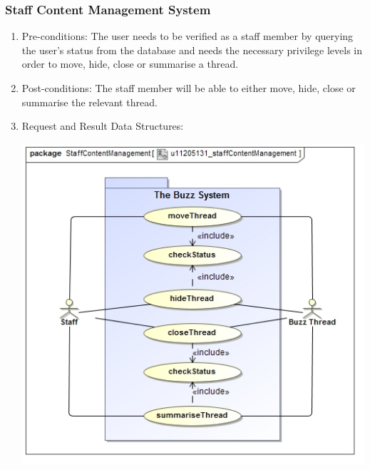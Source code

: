 \documentclass[hidelinks, 12pt, oneside]{article}
\begin{document}
\subsubsection{Staff Content Management System}
\begin{enumerate}
	\item Pre-conditions: The user needs to be verified as a staff member by querying the user's status from the database and needs the necessary privilege levels in order to move, hide, close or summarise a thread.
	
	\item Post-conditions: The staff member will be able to either move, hide, close or summarise the relevant thread.

	\item Request and Result Data Structures:\\
	\centerline{\includegraphics[scale=0.7]{u11205131_staffContentManagement}}
\end{enumerate}

\end{document}
